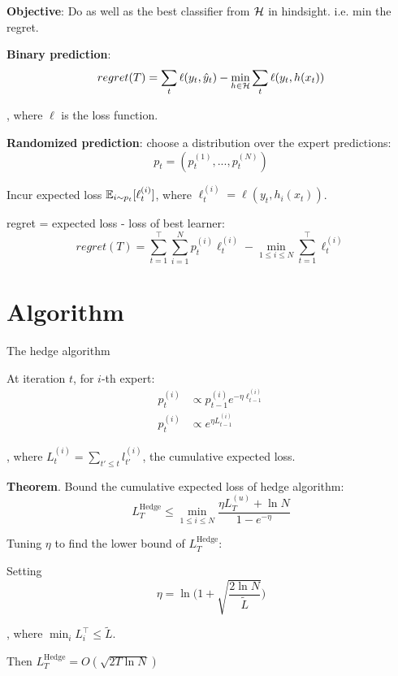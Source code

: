 \documentclass[a4paper]{report}
\begin{document}
\textbf{Objective}: Do as well as the best classifier from $\mathcal{H}$ in hindsight. i.e. min the regret. 

\textbf{Binary prediction}:
$$
regret(T) = \sum_t \ell(y_t, \hat y_t) - \min_{h\in \mathcal{H}} \sum_t \ell(y_t, h(x_t))
$$

, where $\ell$ is the loss function. 

\textbf{Randomized prediction}: choose a distribution over the expert predictions: $$
p_t = (p_t^{(1)},...,p_t^{(N)})
$$

Incur expected loss $\mathbb{E}_{i\sim p_t}[\ell_t^{(i)}]$, where $\ell_t^{(i)}=\ell(y_t, h_i(x_t))$.

regret = expected loss - loss of best learner: 
$$
regret(T) = \sum_{t=1}^\top \sum_{i=1}^N p_t^{(i)}\ell_t^{(i)} - \min_{1\leq i \leq N}\sum_{t=1}^\top\ell_t^{(i)}
$$

\section{Algorithm}
The hedge algorithm

At iteration $t$, for $i$-th expert:
\begin{align*}
p_t^{(i)} &\propto p_{t-1}^{(i)} e^{-\eta \ell_{t-1}^{(i)}} \\
p_t^{(i)} &\propto e^{\eta L_{t-1}^{(i)}}
\end{align*}

, where $L^{(i)}_t = \sum_{t'\leq t} l^{(i)}_{t'}$, the cumulative expected loss. 

\textbf{Theorem}. Bound the cumulative expected loss of hedge algorithm:
$$
L^\text{Hedge}_T\leq \min_{1\leq i \leq N} \frac{\eta L^{(u)}_T+\ln N}{1-e^{-\eta}}
$$

Tuning $\eta$ to find the lower bound of $L^\text{Hedge}_T$:

Setting 
$$
\eta = \ln \Bigg(1+\sqrt{\frac{2\ln N}{\tilde L}}\Bigg)
$$

, where $\min_i L_i^\top \leq \tilde L $. 

Then $L_T^\text{Hedge}=O(\sqrt{2T\ln N})$
\end{document}
